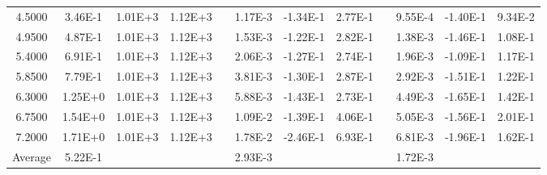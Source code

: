 \begin{center}
\begin{table}[h]
\begin{tabular}{cccccccccccc}
    4.5000 &   3.46E-1 &   1.01E+3 &   1.12E+3 &  &   1.17E-3 &  -1.34E-1 &   2.77E-1 &  &   9.55E-4 &  -1.40E-1 &   9.34E-2 \\
    4.9500 &   4.87E-1 &   1.01E+3 &   1.12E+3 &  &   1.53E-3 &  -1.22E-1 &   2.82E-1 &  &   1.38E-3 &  -1.46E-1 &   1.08E-1 \\
    5.4000 &   6.91E-1 &   1.01E+3 &   1.12E+3 &  &   2.06E-3 &  -1.27E-1 &   2.74E-1 &  &   1.96E-3 &  -1.09E-1 &   1.17E-1 \\
    5.8500 &   7.79E-1 &   1.01E+3 &   1.12E+3 &  &   3.81E-3 &  -1.30E-1 &   2.87E-1 &  &   2.92E-3 &  -1.51E-1 &   1.22E-1 \\
    6.3000 &   1.25E+0 &   1.01E+3 &   1.12E+3 &  &   5.88E-3 &  -1.43E-1 &   2.73E-1 &  &   4.49E-3 &  -1.65E-1 &   1.42E-1 \\
    6.7500 &   1.54E+0 &   1.01E+3 &   1.12E+3 &  &   1.09E-2 &  -1.39E-1 &   4.06E-1 &  &   5.05E-3 &  -1.56E-1 &   2.01E-1 \\
    7.2000 &   1.71E+0 &   1.01E+3 &   1.12E+3 &  &   1.78E-2 &  -2.46E-1 &   6.93E-1 &  &   6.81E-3 &  -1.96E-1 &   1.62E-1 \\
 \hline
Average &  5.22E-1& & & &  2.93E-3& & & &  1.72E-3\\
  \hline
 \end{tabular}
 \label{tab:ANH-E-1SOR20-error}
 \end{table}
\end{center}
\cp

